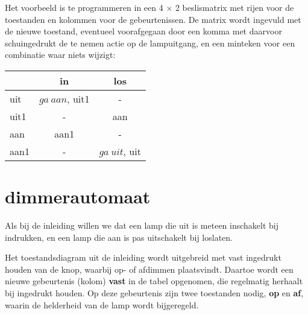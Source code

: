 \documentclass[a4paper, 11pt, fleqn, twoside]{scrartcl}%
\begin{document}
\begin{center}
\end{center}

Het voorbeeld is te programmeren in een 4 $\times$ 2 beslismatrix
 met rijen voor de toestanden en kolommen voor de gebeurtenissen.
De matrix wordt ingevuld met de nieuwe toestand, eventueel voorafgegaan
 door een komma met daarvoor schuingedrukt de te nemen actie op de
 lampuitgang, en een minteken voor een combinatie waar niets wijzigt:\\
 
\begin{center}
\begin{tabular}{|l|c|c|}\hline
     & in & los\\ \hline
 uit & $ga\ aan$, uit1	& -\\ \hline
uit1 & - & aan\\ \hline
 aan & aan1 & -\\ \hline
aan1 & - & $ga\ uit$, uit\\ \hline
\end{tabular}
\end{center}

\section{dimmerautomaat}

Als bij de inleiding willen we dat een lamp die uit is meteen inschakelt
 bij indrukken, en een lamp die aan is pas uitschakelt bij loslaten.

Het toestandsdiagram uit de inleiding wordt uitgebreid met vast ingedrukt
 houden van de knop, waarbij op- of afdimmen plaatsvindt. Daartoe wordt
 een nieuwe gebeurtenis (kolom) \textbf{vast} in de tabel opgenomen, die 
 regelmatig herhaalt bij ingedrukt houden. Op deze gebeurtenis zijn twee
 toestanden nodig, \textbf{op} en \textbf{af}, waarin de helderheid van
 de lamp wordt bijgeregeld.
\end{document}
